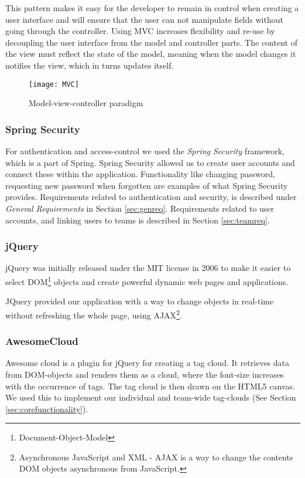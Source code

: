 This pattern makes it easy for the developer to remain in control when creating a user interface and will ensure that the user can not manipulate fields without going through the controller\citep{reenskaug2009dci}. Using MVC increases flexibility and re-use by decoupling the user interface from the model and controller parts. The content of the view must reflect the state of the model, meaning when the model changes it notifies the view, which in turns updates itself. 
\begin{figure}[H]
    \centering
        \texttt{[image: MVC]}
    \caption{Model-view-controller paradigm \citep{mvcmodel}}
    \label{mvc-paradigm}
\end{figure}

\subsubsection{Spring Security}
For authentication and access-control we used the \emph{Spring Security} framework, which is a part of Spring. Spring Security allowed us to create user accounts and connect these within the application. Functionality like changing password, requesting new password when forgotten are examples of what Spring Security provides. Requirements related to authentication and security, is described under \emph{General Requirements} in Section \ref{sec:genreq}. Requirements related to user accounts, and linking users to teams is described in Section \ref{sec:teamreq}.

\subsubsection{jQuery}
jQuery was initially released under the MIT license in 2006 to make it easier to select DOM\footnote{Document-Object-Model} objects and create powerful dynamic web pages and applications.

JQuery provided our application with a way to change objects in real-time without refreshing the whole page, using AJAX\footnote{Asynchronous JavaScript and XML - AJAX is a way to change the contents DOM objects asynchronous from JavaScript.}.

\subsubsection{AwesomeCloud}
Awesome cloud is a plugin for jQuery for creating a tag cloud. It retrieves data from DOM-objects and renders them as a cloud, where the font-size increases with the occurrence of tags. The tag cloud is then drawn on the HTML5 canvas. We used this to implement our individual and team-wide tag-clouds (See Section \ref{sec:corefunctionality}). 

